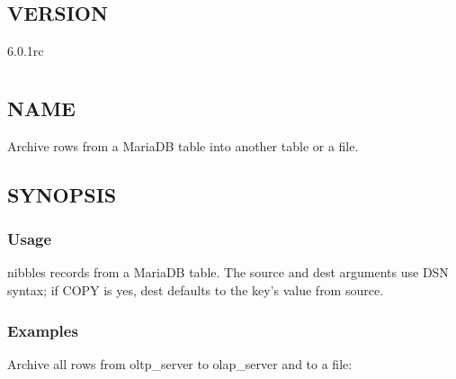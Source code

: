 \documentclass[letterpaper,10pt,english]{sphinxmanual}
\begin{document}
\section{VERSION}
\label{\detokenize{mariadb-align-output:version}}
\sphinxAtStartPar
{} 6.0.1rc


\chapter{}
\label{\detokenize{mariadb-archiver:mariadb-archiver}}\label{\detokenize{mariadb-archiver::doc}}

\section{NAME}
\label{\detokenize{mariadb-archiver:name}}
\sphinxAtStartPar
{} \sphinxhyphen{} Archive rows from a MariaDB table into another table or a file.


\section{SYNOPSIS}
\label{\detokenize{mariadb-archiver:synopsis}}

\subsection{Usage}
\label{\detokenize{mariadb-archiver:usage}}
\begin{sphinxVerbatim}[commandchars=\\\{\}]
 \PYG{p}{[}\PYG{p}{]}    
\end{sphinxVerbatim}

\sphinxAtStartPar
{} nibbles records from a MariaDB table.  The \textendash{}source and \textendash{}dest
arguments use DSN syntax; if COPY is yes, \textendash{}dest defaults to the key’s value
from \textendash{}source.


\subsection{Examples}
\label{\detokenize{mariadb-archiver:examples}}
\sphinxAtStartPar
Archive all rows from oltp\_server to olap\_server and to a file:
\end{document}
